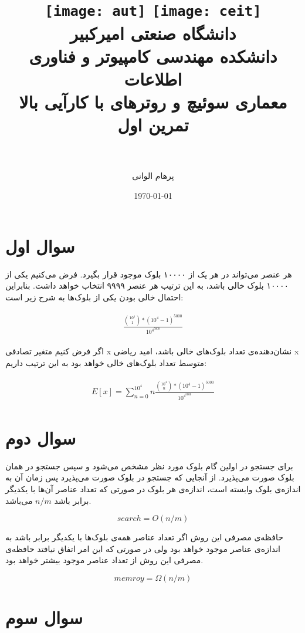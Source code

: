 \documentclass[paper=a4, fontsize=11pt]{article}
\title{
\normalfont\normalsize
\texttt{[image: aut]}
\hspace{5cm}
\texttt{[image: ceit]} \\
\textsc دانشگاه صنعتی امیرکبیر \\
\textsc دانشکده مهندسی کامپیوتر و فناوری اطلاعات
\horrule{0.5pt} \\ [0.4cm] %
\huge معماری سوئیچ و روترهای با کارآیی بالا \\ %
\huge تمرین اول \\ %
\horrule{2pt} \\ [0.5cm] %
}
\author{پرهام الوانی}
\date{\normalsize\today} %
\numberwithin{equation}{section} %
\numberwithin{figure}{section} %
\numberwithin{table}{section} %
\begin{document}
\maketitle %

\section{سوال اول}
\par
هر عنصر می‌تواند در هر یک از ۱۰۰۰۰ بلوک موجود قرار بگیرد.
فرض می‌کنیم یکی از ۱۰۰۰۰ بلوک خالی باشد، به این ترتیب هر عنصر ۹۹۹۹ انتخاب خواهد داشت.
بنابراین احتمال خالی بودن یکی از بلوک‌ها به شرح زیر است:


\begin{align}
\begin{split}
    \frac{\binom{10^4}{1} * (10^4-1)^{5000}}{10^{4^{5000}}}
\end{split}
\end{align}

\par
اگر فرض کنیم متغیر تصادفی x نشان‌دهنده‌ی تعداد بلوک‌های خالی باشد،
امید ریاضی x متوسط تعداد بلوک‌های خالی خواهد بود
به این ترتیب داریم:

\begin{align}
\begin{split}
    E[x] = \sum_{n = 0}^{10^4}n\frac{\binom{10^4}{n} * (10^4-1)^{5000}}{10^{4^{5000}}}
\end{split}
\end{align}

\section{سوال دوم}
\par
برای جستجو در اولین گام بلوک مورد نظر مشخص می‌شود و سپس جستجو در همان بلوک صورت می‌پذیرد.
از آنجایی که جستجو در بلوک صورت می‌پذیرد پس زمان آن به اندازه‌ی بلوک وابسته است،
اندازه‌ی هر بلوک در صورتی که تعداد عناصر آن‌ها با یکدیگر برابر باشد
$n/m$
می‌باشد.

$$
search = O(n/m)
$$

\par
حافظه‌ی مصرفی این روش اگر تعداد عناصر همه‌ی بلوک‌ها با یکدیگر برابر باشد
به اندازه‌ی عناصر موجود خواهد بود ولی
در صورتی که این امر اتفاق نیافتد
حافظه‌ی مصرفی این روش از تعداد عناصر موجود بیشتر خواهد بود.

$$
memroy = \Omega(n/m)
$$

\section{سوال سوم}
\end{document}
